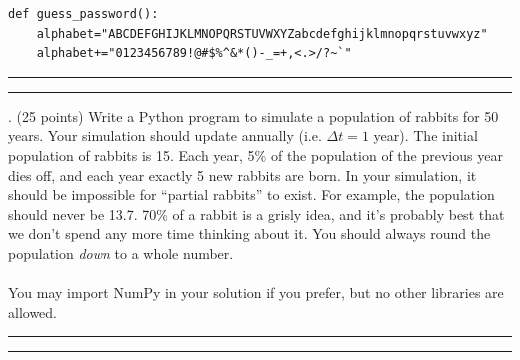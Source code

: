 \documentclass{article}
\begin{document}
\begin{verbatim}
def guess_password():
    alphabet="ABCDEFGHIJKLMNOPQRSTUVWXYZabcdefghijklmnopqrstuvwxyz"
    alphabet+="0123456789!@#$%^&*()-_=+,<.>/?~`"
\end{verbatim}


\vspace*{2em}
\hrule
\vspace{2em}

\vspace{2em}
\hrule height 2pt


\pagebreak \noindent




\newpage
{}. (25 points)
Write a Python program to simulate a population of rabbits for 50 years. Your simulation should update annually (i.e. $\Delta t=1$ year). The initial population of rabbits is 15. Each year, 5\% of the population of the previous year dies off, and each year exactly 5 new rabbits are born. In your simulation, it should be impossible for ``partial rabbits'' to exist. For example, the population should never be 13.7. 70\% of a rabbit is a grisly idea, and it's probably best that we don't spend any more time thinking about it. You should always round the population \emph{down} to a whole number.
\\\\
\noindent You may import NumPy in your solution if you prefer, but no other libraries are allowed.


\vspace*{2em}
\hrule
\vspace{2em}

\vspace{2em}
\hrule height 2pt
\end{document}

